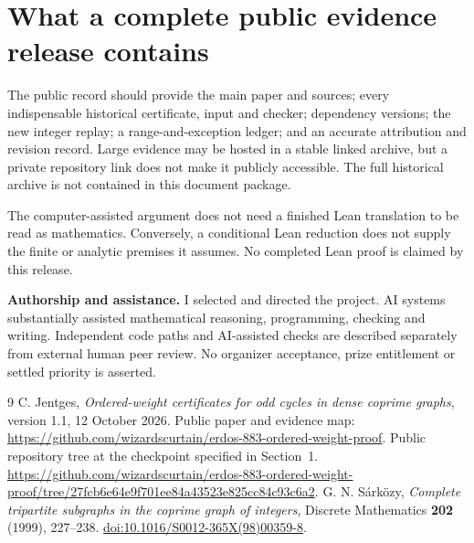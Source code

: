 \documentclass[11pt,letterpaper]{article}
\theoremstyle{remark}\newtheorem{remark}[theorem]{Remark}
\begin{document}
\section{What a complete public evidence release contains}
The public record should provide the main paper and sources; every indispensable historical certificate, input and checker; dependency versions; the new integer replay; a range-and-exception ledger; and an accurate attribution and revision record. Large evidence may be hosted in a stable linked archive, but a private repository link does not make it publicly accessible. The full historical archive is not contained in this document package.

The computer-assisted argument does not need a finished Lean translation to be read as mathematics. Conversely, a conditional Lean reduction does not supply the finite or analytic premises it assumes. No completed Lean proof is claimed by this release.

\medskip
\noindent\textbf{Authorship and assistance.} I selected and directed the project. AI systems substantially assisted mathematical reasoning, programming, checking and writing. Independent code paths and AI-assisted checks are described separately from external human peer review. No organizer acceptance, prize entitlement or settled priority is asserted.

\begin{thebibliography}{9}
 C. Jentges, \emph{Ordered-weight certificates for odd cycles in dense coprime graphs}, version 1.1, 12 October 2026. Public paper and evidence map: \url{https://github.com/wizardscurtain/erdos-883-ordered-weight-proof}.
 Public repository tree at the checkpoint specified in Section~1. \url{https://github.com/wizardscurtain/erdos-883-ordered-weight-proof/tree/27fcb6e64e9f701ee84a43523e825cc84c93c6a2}.
 G. N. S\'ark\"ozy, \emph{Complete tripartite subgraphs in the coprime graph of integers}, Discrete Mathematics \textbf{202} (1999), 227--238. \href{https://doi.org/10.1016/S0012-365X(98)00359-8}{doi:10.1016/S0012-365X(98)00359-8}.
\end{thebibliography}
\end{document}
